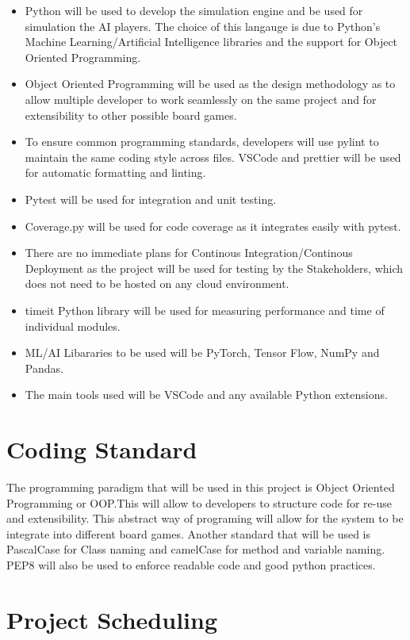 \documentclass{article}
\begin{document}
\begin{itemize}
\item Python will be used to develop the simulation engine and be used for simulation the AI players. 
The choice of this langauge is due to Python's Machine Learning/Artificial Intelligence libraries and the support for
 Object Oriented Programming.
\item Object Oriented Programming will be used as the design methodology as to allow multiple developer to work seamlessly 
on the same project and for extensibility to other possible board games. 
\item To ensure common programming standards, developers will use pylint to maintain the same coding style across files. 
VSCode and prettier will be used for automatic formatting and linting.
\item Pytest will be used for integration and unit testing.
\item Coverage.py will be used for code coverage as it integrates easily with pytest.
\item There are no immediate plans for Continous Integration/Continous Deployment as the project will be used for testing by the 
Stakeholders, which does not need to be hosted on any cloud environment.
\item timeit Python library will be used for measuring performance and time of individual modules.
\item ML/AI Libararies to be used will be PyTorch, Tensor Flow, NumPy and Pandas.
\item The main tools used will be VSCode and any available Python extensions.
\end{itemize}

\section{Coding Standard}
The programming paradigm that will be used in this project is Object Oriented Programming or OOP.This will allow to developers to structure code
for re-use and extensibility. This abstract way of programing will allow for the system to be integrate into different board games. Another standard that
will be used is PascalCase for Class naming and camelCase for method and variable naming. PEP8 will also be used to enforce readable code and good python practices.

\section{Project Scheduling}


\end{document}
